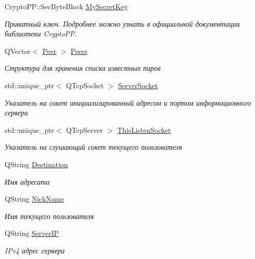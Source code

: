 \begin{DoxyCompactItemize}
Crypto\+P\+P\+::\+Sec\+Byte\+Block \hyperlink{class_client_window_a771a96af9209f03fab4db74ad343c280}{My\+Secret\+Key}
\begin{DoxyCompactList}\small\item\em Приватный ключ. Подробнее можно узнать в официальной документации библиотеки Crypto\+PP. \end{DoxyCompactList}\item 
Q\+Vector$<$ \hyperlink{class_peer}{Peer} $>$ \hyperlink{class_client_window_a8e6109e2659c78a3f959df0a450862ae}{Peers}
\begin{DoxyCompactList}\small\item\em Структура для хранения списка известных пиров \end{DoxyCompactList}\item 
std\+::unique\+\_\+ptr$<$ Q\+Tcp\+Socket $>$ \hyperlink{class_client_window_a74e7b0eb499506ff2071e314cdab83dc}{Server\+Socket}
\begin{DoxyCompactList}\small\item\em Указатель на сокет инициализированный адресом и портом информационного сервера \end{DoxyCompactList}\item 
std\+::unique\+\_\+ptr$<$ Q\+Tcp\+Server $>$ \hyperlink{class_client_window_acff726e7e30b6bb9fd190181fbea4835}{This\+Listen\+Socket}
\begin{DoxyCompactList}\small\item\em Указатель на слушающий сокет текущего пользователя \end{DoxyCompactList}\item 
Q\+String \hyperlink{class_client_window_a98ff51a0d70a591431b56d5e001a51d9}{Destination}
\begin{DoxyCompactList}\small\item\em Имя адресата \end{DoxyCompactList}\item 
Q\+String \hyperlink{class_client_window_a0a1282c1054a3810a4c772db4ffde530}{Nick\+Name}
\begin{DoxyCompactList}\small\item\em Имя текущего пользователя \end{DoxyCompactList}\item 
Q\+String \hyperlink{class_client_window_abaec733868dc94910f89011513ab4c7b}{Server\+IP}
\begin{DoxyCompactList}\small\item\em I\+Pv4 адрес сервера \end{DoxyCompactList}\item 

\end{DoxyCompactItemize}
